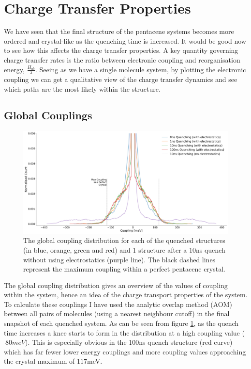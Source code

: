 \section{Charge Transfer Properties}
We have seen that the final structure of the pentacene systems becomes more ordered and crystal-like as the quenching time is increased. It would be good now to see how this affects the charge transfer properties. A key quantity governing charge transfer rates is the ratio between electronic coupling and reorganisation energy, $\frac{H_{ab}}{\lambda}$. Seeing as we have a single molecule system, by plotting the electronic coupling we can get a qualitative view of the charge transfer dynamics and see which paths are the most likely within the structure.
\subsection{Global Couplings}
\begin{figure}[ht]
	\includegraphics[width=\textwidth]{./img/DifferentQuenchTimes/GlobalCouplings.png}
	\caption{\label{fig:glob_coup}The global coupling distribution for each of the quenched structures (in blue, orange, green and red) and 1 structure after a 10ns quench without using electrostatics (purple line). The black dashed lines represent the maximum coupling within a perfect pentacene crystal.}
\end{figure}
\noindent The global coupling distribution gives an overview of the values of coupling within the system, hence an idea of the charge transport properties of the system. To calculate these couplings I have used the analytic overlap method (AOM)\cite{gajdos_ultrafast_2014} between all pairs of molecules (using a nearest neighbour cutoff) in the final snapshot of each quenched system. As can be seen from figure \ref{fig:glob_coup}, as the quench time increases a knee starts to form in the distribution at a high coupling value ($~80 meV$). This is especially obvious in the 100ns quench structure (red curve) which has far fewer lower energy couplings and more coupling values approaching the crystal maximum of $117$meV.

